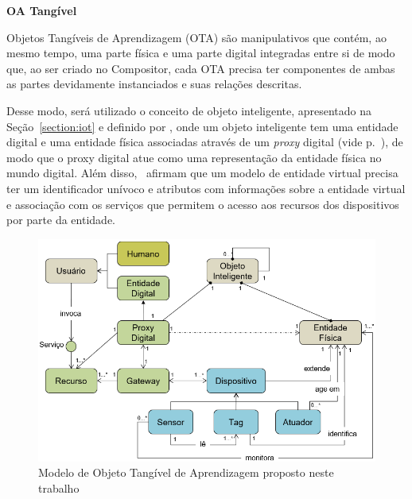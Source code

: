 


\textbf{OA Tangível}\label{section:OA_fisicovirtual}

Objetos Tangíveis de Aprendizagem (OTA) são manipulativos que contém, ao mesmo tempo, uma parte física e uma parte digital integradas entre si de modo que, ao ser criado no Compositor, cada OTA precisa ter componentes de ambas as partes devidamente instanciados e suas relações descritas.

Desse modo, será utilizado o conceito de objeto inteligente, apresentado na Seção~\ref{section:iot} e definido por \cite{serbanati:2011}, onde um objeto inteligente tem uma entidade digital e uma entidade física associadas através de um \textit{proxy} digital (vide p.~\pageref{fig:modeloiot}), de modo que o proxy digital atue como uma representação da entidade física no mundo digital. Além disso,~\cite{pires:2015} afirmam que um modelo de entidade virtual precisa ter um identificador unívoco e 
atributos com informações sobre a entidade virtual e associação com os serviços que permitem o acesso aos recursos dos dispositivos por parte da entidade.

\begin{figure}[ht]
	\centering
	\includegraphics[width=0.8\linewidth]{chapters/proposedMethod/modelo_OTA.png}
	\caption{Modelo de Objeto Tangível de Aprendizagem proposto neste trabalho}
	\label{fig:modelo_ota}
\end{figure}

